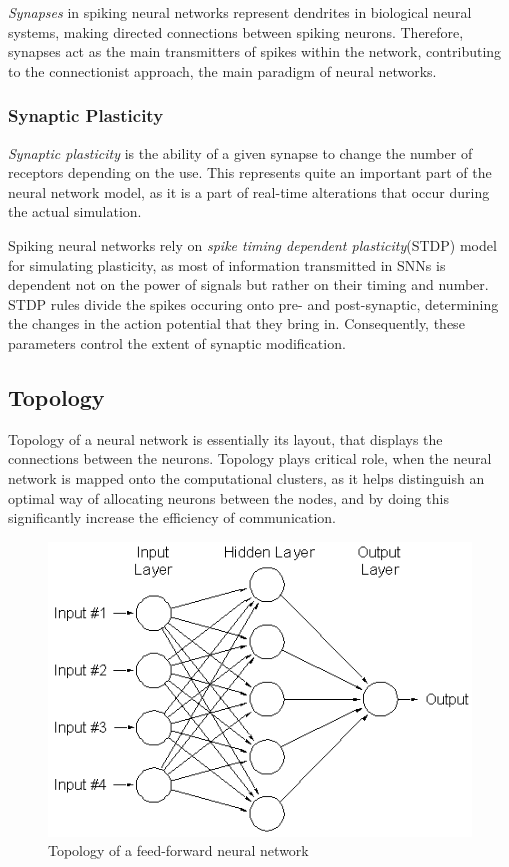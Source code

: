 \emph{Synapses} in spiking neural networks represent dendrites in biological neural systems, making directed connections between spiking neurons. 
Therefore, synapses act as the main transmitters of spikes within the network, contributing to the connectionist approach, the main paradigm of neural networks.

\subsubsection{Synaptic Plasticity}

\emph{Synaptic plasticity} is the ability of a given synapse to change the number of receptors depending on the use.\cite{WulframGerstner2002} This represents quite an
important part of the neural network model, as it is a part of real-time alterations that occur during the actual simulation.

Spiking neural networks rely on \emph{spike timing dependent plasticity}(STDP) model for simulating plasticity, as most of information transmitted in SNNs is dependent not on 
the power of signals but rather on their timing and number. STDP rules divide the spikes occuring onto pre- and post-synaptic, determining the changes in the action potential that
they bring in. Consequently, these parameters control the extent of synaptic modification.\cite{SenSong2000}

\subsection{Topology}

Topology of a neural network is essentially its layout, that displays the connections between the neurons. Topology plays critical role, when 
the neural network is mapped onto the computational clusters, as it helps distinguish an optimal way of allocating neurons between the nodes,
and by doing this significantly increase the efficiency of communication.

\begin{figure}[h]
\begin{center}
\includegraphics[scale = 0.3]{images/topology.png}
\end{center}
\caption{Topology of a feed-forward neural network\cite{Tan2006}}
\end{figure}

